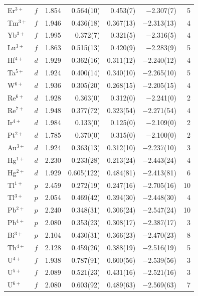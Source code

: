 \begin{longtable}{l l r r r r r}
  Er$^{3+}$            & $f$   & 1.854 &      0.564(10) &       0.453(7) &    $-$2.307(7) & 5 \\
  Tm$^{3+}$            & $f$   & 1.946 &      0.436(18) &      0.367(13) &   $-$2.313(13) & 4 \\
  Yb$^{3+}$            & $f$   & 1.995 &       0.372(7) &       0.321(5) &    $-$2.316(5) & 4 \\
  Lu$^{3+}$            & $f$   & 1.863 &      0.515(13) &       0.420(9) &    $-$2.283(9) & 5 \\
  Hf$^{4+}$            & $d$   & 1.929 &      0.362(16) &      0.311(12) &   $-$2.240(12) & 4 \\
  Ta$^{5+}$            & $d$   & 1.924 &      0.400(14) &      0.340(10) &   $-$2.265(10) & 5 \\
  W$^{6+}$             & $d$   & 1.936 &      0.305(20) &      0.268(15) &   $-$2.205(15) & 4 \\
  Re$^{6+}$            & $d$   & 1.928 &       0.363(0) &       0.312(0) &    $-$2.241(0) & 2 \\
  Re$^{7+}$            & $d$   & 1.948 &      0.377(72) &      0.323(54) &   $-$2.271(54) & 4 \\
  Ir$^{4+}$            & $d$   & 1.984 &       0.133(0) &       0.125(0) &    $-$2.109(0) & 2 \\
  Pt$^{2+}$            & $d$   & 1.785 &       0.370(0) &       0.315(0) &    $-$2.100(0) & 2 \\
  Au$^{3+}$            & $d$   & 1.924 &      0.363(13) &      0.312(10) &   $-$2.237(10) & 3 \\
  Hg$^{1+}$            & $d$   & 2.230 &      0.233(28) &      0.213(24) &   $-$2.443(24) & 4 \\
  Hg$^{2+}$            & $d$   & 1.929 &     0.605(122) &      0.484(81) &   $-$2.413(81) & 6 \\
  Tl$^{1+}$            & $p$   & 2.459 &      0.272(19) &      0.247(16) &   $-$2.705(16) & 10 \\
  Tl$^{3+}$            & $p$   & 2.054 &      0.469(42) &      0.394(30) &   $-$2.448(30) & 4 \\
  Pb$^{2+}$            & $p$   & 2.240 &      0.348(31) &      0.306(24) &   $-$2.547(24) & 10 \\
  Pb$^{4+}$            & $p$   & 2.080 &      0.353(23) &      0.308(17) &   $-$2.387(17) & 3 \\
  Bi$^{3+}$            & $p$   & 2.104 &      0.430(31) &      0.366(23) &   $-$2.470(23) & 8 \\
  Th$^{4+}$            & $f$   & 2.128 &      0.459(26) &      0.388(19) &   $-$2.516(19) & 5 \\
  U$^{4+}$             & $f$   & 1.938 &      0.787(91) &      0.600(56) &   $-$2.539(56) & 3 \\
  U$^{5+}$             & $f$   & 2.089 &      0.521(23) &      0.431(16) &   $-$2.521(16) & 3 \\
  U$^{6+}$             & $f$   & 2.080 &      0.603(92) &      0.489(63) &   $-$2.569(63) & 7 \\
\end{longtable}

